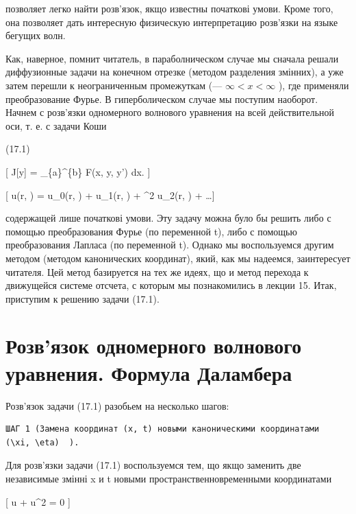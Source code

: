 \documentclass[
  ukrainian,
]{article}
\begin{document}
позволяет легко найти розв'язок, якщо известны початкові умови. Кроме
того, она позволяет дать интересную физическую интерпретацию розв'язки
на языке бегущих волн.

Как, наверное, помнит читатель, в параболническом случае мы сначала
решали диффузионные задачи на конечном отрезке (методом разделения
змінних), а уже затем перешли к неограниченным промежуткам (---
\(\infty < x < \infty\) ), где применяли преобразование Фурье. В
гиперболическом случае мы поступим наоборот. Начнем с розв'язки
одномерного волнового уравнения на всей действительной оси, т. е. с
задачи Коши

(17.1)

{[} J{[}y{]} = \int\_\{a\}\^{}\{b\} F(x, y, y') dx. {]}

{[} u(r, \theta) = u\_0(r, \theta) + \varepsilon u\_1(r, \theta) +
\varepsilon\^{}2 u\_2(r, \theta) + \dots {]}

содержащей лише початкові умови. Эту задачу можна було бы решить либо с
помощью преобразования Фурье (по переменной t), либо с помощью
преобразования Лапласа (по переменной t). Однако мы воспользуемся другим
методом (методом канонических координат), який, как мы надеемся,
заинтересует читателя. Цей метод базируется на тех же идеях, що и метод
перехода к движущейся системе отсчета, с которым мы познакомились в
лекции 15. Итак, приступим к решению задачи (17.1).

\section{Розв'язок одномерного волнового уравнения. Формула
Даламбера}\label{ux440ux43eux437ux432ux44fux437ux43eux43a-ux43eux434ux43dux43eux43cux435ux440ux43dux43eux433ux43e-ux432ux43eux43bux43dux43eux432ux43eux433ux43e-ux443ux440ux430ux432ux43dux435ux43dux438ux44f.-ux444ux43eux440ux43cux443ux43bux430-ux434ux430ux43bux430ux43cux431ux435ux440ux430}

Розв'язок задачи (17.1) разобьем на несколько шагов:

\begin{verbatim}
ШАГ 1 (Замена координат (x, t) новыми каноническими координатами  (\xi, \eta)  ).
\end{verbatim}

Для розв'язки задачи (17.1) воспользуемся тем, що якщо заменить две
независимые змінні x и t новыми пространственновременными координатами

{[} \Delta u + \varepsilon u\^{}2 = 0 {]}
\end{document}
